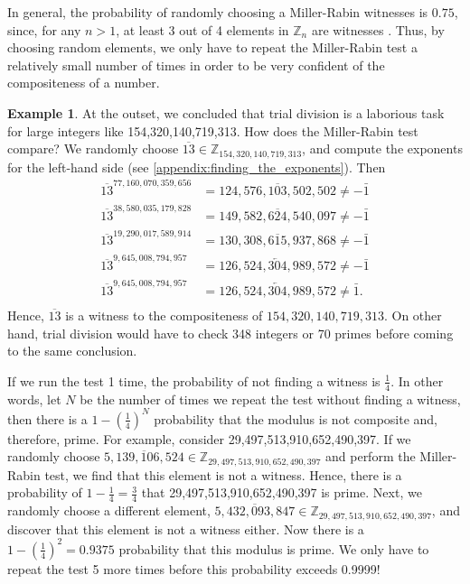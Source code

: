 \documentclass[10pt, titlepage]{amsart}
\newcommand\Z{{\mathbb Z}}
\theoremstyle{definition}
\newtheorem{example}{Example}[subsection]
\begin{document}
	In general, the probability of randomly choosing a Miller-Rabin witnesses is $0.75$, since, for any $n > 1$, at least 3 out of 4 elements in $\Z_n$ are witnesses \cite{pommersheim}. Thus, by choosing random elements, we only have to repeat the Miller-Rabin test a relatively small number of times in order to be very confident of the compositeness of a number. 
	
	\begin{example}
		At the outset, we concluded that trial division is a laborious task for large integers like 154,320,140,719,313.
		How does the Miller-Rabin test compare?
		We randomly choose $\overline{13} \in \Z_{154,320,140,719,313}$, and compute the exponents for the left-hand side (see \cref{appendix:finding_the_exponents}).
		Then 
		\begin{align*}
			\overline{13}^{77,160,070,359,656} &= \overline{124,576,103,502,502} \neq -\bar{1} \\
			\overline{13}^{38,580,035,179,828} &= \overline{149,582,624,540,097} \neq -\bar{1} \\
			\overline{13}^{19,290,017,589,914} &= \overline{130,308,615,937,868} \neq -\bar{1} \\
			\overline{13}^{9,645,008,794,957} &= \overleftarrow{126,524,304,989,572} \neq -\bar{1} \\
			\overline{13}^{9,645,008,794,957} &= \overleftarrow{126,524,304,989,572} \neq \bar{1}. \\
		\end{align*}
		Hence, $\overline{13}$ is a witness to the compositeness of $154,320,140,719,313$.
		On other hand, trial division would have to check 348 integers or 70 primes before coming to the same conclusion.
	\end{example}
	
	If we run the test 1 time, the probability of not finding a witness is $\frac{1}{4}$. 
	In other words, let $N$ be the number of times we repeat the test without finding a witness, then there is a $1 - \left( \frac{1}{4} \right)^N$ probability that the modulus is not composite and, therefore, prime.
	For example, consider 29,497,513,910,652,490,397.
	If we randomly choose $\overline{5,139,106,524} \in \Z_{29,497,513,910	,652,490,397}$ and perform the Miller-Rabin test, we find that this element is not a witness.
	Hence, there is a probability of $1 - \frac{1}{4} = \frac{3}{4}$ that 29,497,513,910,652,490,397 is prime.
	Next, we randomly choose a different element, $\overline{5,432,093,847} \in \Z_{29,497,513,910,652,490,397}$, and discover that this element is not a witness either.
	Now there is a $1 - \left( \frac{1}{4} \right)^2 = 0.9375$ probability that this modulus is prime.
	We only have to repeat the test 5 more times before this probability exceeds 0.9999!
	
\end{document}

